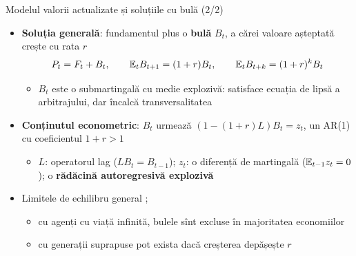 \begin{frame}{Modelul valorii actualizate și soluțiile cu bulă (2/2)}
\itemsize{\small}
\begin{itemize}
    \item \textbf{Soluția generală}: fundamentul plus o \textbf{bulă} $B_t$, a cărei valoare așteptată crește cu rata $r$ \[ P_t = F_t + B_t, \qquad \mathbb{E}_t B_{t+1} = (1 + r)B_t, \qquad \mathbb{E}_t B_{t+k} = (1 + r)^k B_t \]
    \begin{itemize}
        \item $B_t$ este o submartingală cu medie explozivă: satisface ecuația de lipsă a arbitrajului, dar încalcă transversalitatea
    \end{itemize}
    \item \textbf{Conținutul econometric}: $B_t$ urmează $(1 - (1 + r)L)B_t = z_t$, un AR(1) cu coeficientul $1 + r > 1$
    \begin{itemize}
        \item $L$: operatorul lag ($LB_t = B_{t-1}$); $z_t$: o diferență de martingală ($\mathbb{E}_{t-1}z_t = 0$); o \textbf{rădăcină autoregresivă explozivă}
    \end{itemize}
    \item Limitele de echilibru general ; 
    \begin{itemize}
        \item cu agenți cu viață infinită, bulele sînt excluse în majoritatea economiilor
        \item cu generații suprapuse pot exista dacă creșterea depășește $r$
    \end{itemize}
\end{itemize}
\end{frame}

